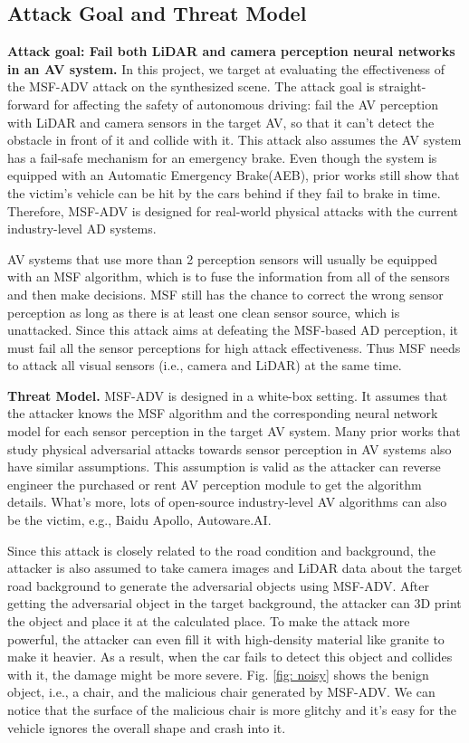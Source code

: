 \subsection{Attack Goal and Threat Model}
\textbf{Attack goal: Fail both LiDAR and camera perception neural networks in an AV system.}
In this project, we target at evaluating the effectiveness of the MSF-ADV\cite{msf-adv} attack on the synthesized scene.
The attack goal is straight-forward for affecting the safety of autonomous driving: 
fail the AV perception with LiDAR and camera sensors in the target AV, so that it can't detect the obstacle in front of it and collide with it.
This attack also assumes the AV system has a fail-safe mechanism for an emergency brake. 
Even though the system is equipped with an Automatic Emergency Brake(AEB), 
prior works still show that the victim's vehicle can be hit by the cars behind if they fail to brake in time.
Therefore, MSF-ADV is designed for real-world physical attacks with the current industry-level AD systems.

AV systems that use more than 2 perception sensors will usually be equipped with an MSF algorithm,
which is to fuse the information from all of the sensors and then make decisions.
MSF still has the chance to correct the wrong sensor perception as long as there is at least one clean sensor source, which is unattacked.
Since this attack aims at defeating the MSF-based AD perception, it must fail all the sensor perceptions for high attack effectiveness.
Thus MSF needs to attack all visual sensors (i.e., camera and LiDAR) at the same time.

\textbf{Threat Model.} 
MSF-ADV\cite{msf-adv} is designed in a white-box setting. 
It assumes that the attacker knows the MSF algorithm and the corresponding neural network model for each sensor perception in the target AV system.
Many prior works that study physical adversarial attacks towards sensor perception in AV systems also have similar assumptions\cite{adv1, adv2}. 
This assumption is valid as the attacker can reverse engineer the purchased or rent AV perception module to get the algorithm details.
What's more, lots of open-source industry-level AV algorithms can also be the victim, e.g., Baidu Apollo\cite{apollo}, Autoware.AI\cite{autoware}.

Since this attack is closely related to the road condition and background, 
the attacker is also assumed to take camera images and LiDAR data about the target road background to generate the adversarial objects using MSF-ADV.
After getting the adversarial object in the target background, the attacker can 3D print the object and place it at the calculated place.
To make the attack more powerful, the attacker can even fill it with high-density material like granite to make it heavier.
As a result, when the car fails to detect this object and collides with it, the damage might be more severe.
Fig. \ref{fig: noisy} shows the benign object, i.e., a chair, and the malicious chair generated by MSF-ADV\cite{msf-adv}. We can notice that the surface of the malicious chair is more glitchy and it's easy for the vehicle ignores the overall shape and crash into it.

